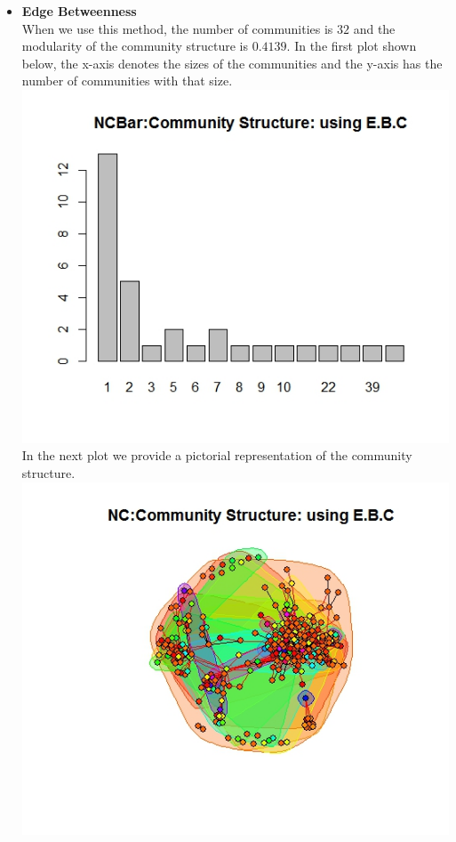 \documentclass{article}
\begin{document}
\begin{itemize}
	\item \textbf{Edge Betweenness}\\
	When we use this method, the number of communities is $32$ and the modularity of the community
	structure is $0.4139$.
	In the first plot shown below, the x-axis denotes the sizes of the communities and the y-axis has the number of communities with that size.\\
	\includegraphics[scale=0.4]{q5d} \\
	In the next plot we provide a pictorial representation of the community structure.\\
	\includegraphics[scale=0.4]{q5e} \\ 

\end{itemize}
\end{document}

